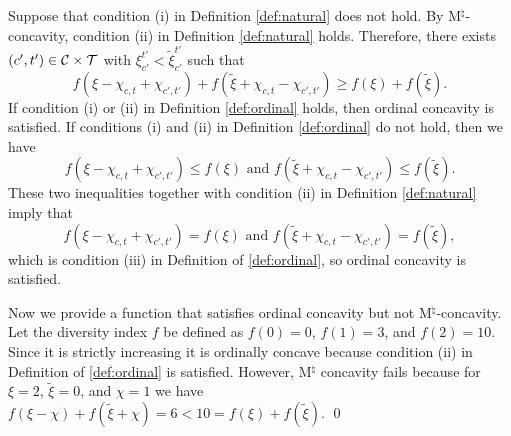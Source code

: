 \documentclass[12pt]{amsart}
\theoremstyle{remark}
\begin{document}
Suppose that condition (i) in Definition \ref{def:natural} does not hold. By
M$^{\natural}$-concavity, condition (ii) in Definition \ref{def:natural} holds.
Therefore, there exists $(c',t') \in \mathcal{C} \times \mathcal{T}$ with  $\xi_{c'}^{t'}<\tilde{\xi}_{c'}^{t'}$ such that
\[f(\xi-\chi_{c,t}+\chi_{c',t'})+f(\tilde{\xi}+\chi_{c,t}-\chi_{c',t'})
\geq f(\xi)+f(\tilde \xi).\]
If condition (i) or (ii) in Definition \ref{def:ordinal} holds, then ordinal concavity
is satisfied. If conditions (i) and (ii) in Definition \ref{def:ordinal}
do not hold, then we have
\[f(\xi-\chi_{c,t}+\chi_{c',t'})\leq f(\xi) \mbox{ and }
f(\tilde \xi+\chi_{c,t}-\chi_{c',t'}) \leq f(\tilde \xi).\]
These two inequalities together with condition (ii) in Definition \ref{def:natural}
imply that
\[f(\xi-\chi_{c,t}+\chi_{c',t'})=f(\xi) \mbox{ and } f(\tilde \xi+\chi_{c,t}-\chi_{c',t'}) = f(\tilde \xi),\]
which is condition (iii) in Definition of \ref{def:ordinal}, so ordinal concavity is satisfied.

Now we provide a function that satisfies ordinal concavity but not M$^{\natural}$-concavity. Let the diversity index $f$ be defined as $f(0)=0$, $f(1)=3$, and
$f(2)=10$. Since it is strictly increasing it is ordinally concave because
condition (ii) in Definition of \ref{def:ordinal} is satisfied. However,
M$^{\natural}$ concavity fails because for $\xi=2$, $\tilde \xi=0$, and $\chi=1$
we have $f(\xi-\chi)+f(\tilde{\xi}+\chi)=6 < 10=f(\xi)+f(\tilde \xi)$.
\qed
\end{document}
